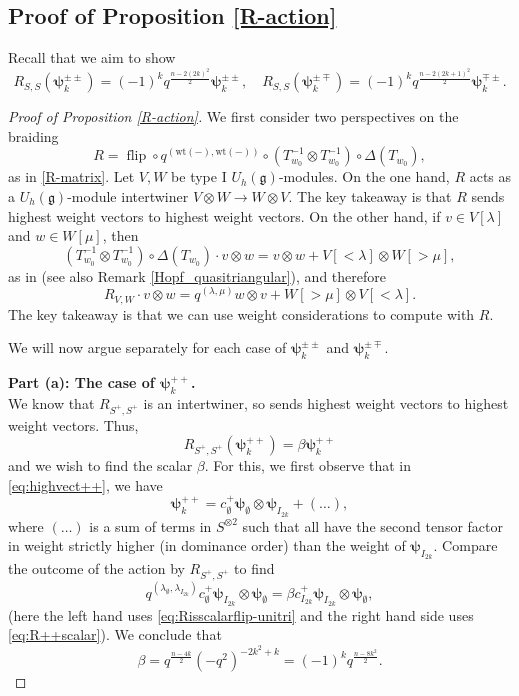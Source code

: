 \documentclass[10pt]{amsart}
\numberwithin{equation}{section}
\theoremstyle{definition}
\newcommand{\ot}{\otimes}
\newcommand{\flip}{\operatorname{flip}}
\newcommand{\wt}{\mathrm{wt}}
\newcommand{\g}{\mathfrak{g}}
\newcommand{\hwp}{\boldsymbol{\psi}}
\begin{document}
\subsection{Proof of Proposition \ref{R-action}}\label{proof6.1}

Recall that we aim to show 
\[
    R_{S,S}(\hwp_k^{\pm \pm})=(-1)^kq^{\frac{n-2(2k)^2}{2}} \hwp_k^{\pm \pm}, \quad R_{S,S}(\hwp_k^{\pm \mp})=(-1)^kq^{\frac{n-2(2k+1)^2}{2}} \hwp_k^{\mp \pm}.
\]

\begin{proof}[Proof of Proposition \ref{R-action}]
 We first consider two perspectives on the braiding
 \[
 R=\flip\circ q^{(\wt(-),\wt(-))}\circ (T_{w_0}^{-1} \ot T_{w_0}^{-1} 
 )\circ \Delta(T_{w_0}),
 \]
 as in \eqref{R-matrix}. Let $V,W$ be type I $U_h(\g)$-modules. On the one hand, $R$ acts as a $U_h(\g)$-module intertwiner $V\otimes W\rightarrow W\otimes V$. The key takeaway is that $R$ sends highest weight vectors to highest weight vectors. On the other hand, if $v\in V[\lambda]$ and $w\in W[\mu]$, then
 \[
(T_{w_0}^{-1} \ot T_{w_0}^{-1} 
 )\circ \Delta(T_{w_0})\cdot v\otimes w= v\otimes w + V[<\lambda]\otimes W[> \mu],
 \]
as in \cite[Proposition 3.5.]{BER} (see also Remark \ref{Hopf_quasitriangular}), and therefore
 \begin{equation}\label{eq:Risscalarflip-unitri}
 R_{V,W}\cdot v\otimes w = q^{(\lambda, \mu)}w\otimes v + W[>\mu]\otimes V[<\lambda].
 \end{equation}
 The key takeaway is that we can use weight considerations to compute with $R$. 
 
 We will now argue separately for each case of $\hwp_k^{\pm\pm}$ and $\hwp_k^{\pm\mp}$.

\smallskip
\noindent\textbf{Part (a): The case of $\hwp_k^{++}$.}\\

We know that $R_{S^+,S^+}$ is an intertwiner, so sends highest weight vectors to highest weight vectors. Thus,
\begin{equation}\label{eq:R++scalar}
    R_{S^+,S^+}(\hwp_k^{++})=\beta\hwp_k^{++}
\end{equation}
and we wish to find the scalar $\beta$. For this, we first observe that in \eqref{eq:highvect++}, we have
\[
\hwp_k^{++}=c^+_{\emptyset}\hwp_{\emptyset}\otimes \hwp_{I_{2k}} + (\dots),
\]
where $(\dots)$ is a sum of terms in $S^{\otimes 2}$ such that all have the second tensor factor in weight strictly higher (in dominance order) than the weight of $\hwp_{I_{2k}}$. Compare the outcome of the action by $R_{S^+,S^+}$ to find
\[
q^{(\lambda_{\emptyset},\lambda_{I_{2k}})}c^+_{\emptyset}\hwp_{I_{2k}} \otimes \hwp_{\emptyset}=\beta c^+_{I_{2k}}\hwp_{I_{2k}} \otimes \hwp_{\emptyset},
\]
(here the left hand uses \eqref{eq:Risscalarflip-unitri} and the right hand side uses \eqref{eq:R++scalar}). We conclude that
\[
    \beta=q^{\frac{n-4k}{2}}(-q^2)^{-2k^2+k}=(-1)^kq^{\frac{n-8k^2}{2}}.
\]


\end{proof}
\end{document}
